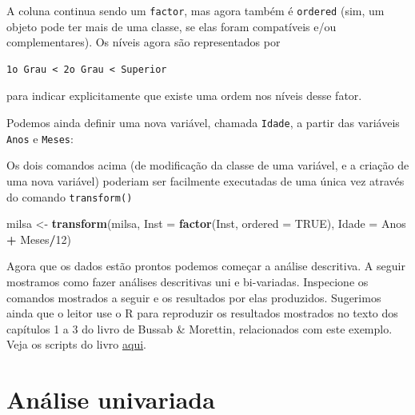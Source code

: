 \documentclass[10pt,a4paper]{book}
\newenvironment{Shaded}{\begin{snugshade}}{\end{snugshade}}
\newcommand{\KeywordTok}[1]{\textcolor[rgb]{0.13,0.29,0.53}{\textbf{#1}}}
\newcommand{\DataTypeTok}[1]{\textcolor[rgb]{0.13,0.29,0.53}{#1}}
\newcommand{\DecValTok}[1]{\textcolor[rgb]{0.00,0.00,0.81}{#1}}
\newcommand{\StringTok}[1]{\textcolor[rgb]{0.31,0.60,0.02}{#1}}
\newcommand{\OtherTok}[1]{\textcolor[rgb]{0.56,0.35,0.01}{#1}}
\newcommand{\OperatorTok}[1]{\textcolor[rgb]{0.81,0.36,0.00}{\textbf{#1}}}
\newcommand{\NormalTok}[1]{#1}
\begin{document}
A coluna continua sendo um \texttt{factor}, mas agora também é
\texttt{ordered} (sim, um objeto pode ter mais de uma classe, se elas
foram compatíveis e/ou complementares). Os níveis agora são
representados por

\begin{verbatim}
1o Grau < 2o Grau < Superior
\end{verbatim}

para indicar explicitamente que existe uma ordem nos níveis desse fator.

Podemos ainda definir uma nova variável, chamada \texttt{Idade}, a
partir das variáveis \texttt{Anos} e \texttt{Meses}:

\begin{Shaded}
\end{Shaded}

Os dois comandos acima (de modificação da classe de uma variável, e a
criação de uma nova variável) poderiam ser facilmente executadas de uma
única vez através do comando \texttt{transform()}

\begin{Shaded}
\begin{Highlighting}[]
\NormalTok{milsa <-}\StringTok{ }\KeywordTok{transform}\NormalTok{(milsa,}
                   \DataTypeTok{Inst =} \KeywordTok{factor}\NormalTok{(Inst, }\DataTypeTok{ordered =} \OtherTok{TRUE}\NormalTok{),}
                   \DataTypeTok{Idade =}\NormalTok{ Anos }\OperatorTok{+}\StringTok{ }\NormalTok{Meses}\OperatorTok{/}\DecValTok{12}\NormalTok{)}
\end{Highlighting}
\end{Shaded}

Agora que os dados estão prontos podemos começar a análise descritiva. A
seguir mostramos como fazer análises descritivas uni e bi-variadas.
Inspecione os comandos mostrados a seguir e os resultados por elas
produzidos. Sugerimos ainda que o leitor use o R para reproduzir os
resultados mostrados no texto dos capítulos 1 a 3 do livro de Bussab \&
Morettin, relacionados com este exemplo. Veja os scripts do livro
\href{https://rpubs.com/EstatBasica/Introd}{aqui}.

\section{Análise univariada}\label{anuxe1lise-univariada}
\end{document}
